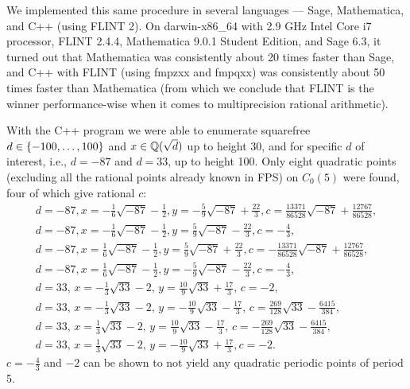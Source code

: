 We implemented this same procedure in several languages --- Sage,
Mathematica, and C++ (using FLINT 2). On darwin-x86\_64 with 2.9 GHz
Intel Core i7 processor, FLINT 2.4.4, Mathematica 9.0.1 Student
Edition, and Sage 6.3, it turned out that Mathematica was consistently
about 20 times faster than Sage, and C++ with FLINT (using fmpzxx and
fmpqxx) was consistently about 50 times faster than Mathematica (from
which we conclude that FLINT is the winner performance-wise when it
comes to multiprecision rational arithmetic).

With the C++ program we were able to enumerate squarefree $d \in
\left\{-100, \dots, 100\right\}$ and $x \in \mathbb{Q}(\sqrt{d})$ up to height 30, and
for specific $d$ of interest, i.e., $d = -87$ and $d = 33$,
up to height 100. Only eight quadratic points (excluding all the
rational points already known in FPS) on $C_0(5)$ were found, four of
which give rational $c$:
\[
\begin{gathered}
  d = -87,
  x = -\frac{1}{6} \sqrt{-87} - \frac{1}{2},
  y = -\frac{5}{9} \sqrt{-87} + \frac{22}{3},
  c = \frac{13371}{86528} \sqrt{-87} + \frac{12767}{86528},
  \\
  d = -87,
  x = -\frac{1}{6} \sqrt{-87} - \frac{1}{2},
  y = \frac{5}{9} \sqrt{-87} - \frac{22}{3},
  c = -\frac{4}{3},
  \\
  d = -87,
  x = \frac{1}{6} \sqrt{-87} - \frac{1}{2},
  y = \frac{5}{9} \sqrt{-87} + \frac{22}{3},
  c = -\frac{13371}{86528} \sqrt{-87} + \frac{12767}{86528},
  \\
  d = -87,
  x = \frac{1}{6} \sqrt{-87} - \frac{1}{2},
  y = -\frac{5}{9} \sqrt{-87} - \frac{22}{3},
  c = -\frac{4}{3},
  \\
  d = 33,\,
  x = -\frac{1}{3} \sqrt{33} - 2,\,
  y = \frac{10}{9} \sqrt{33} + \frac{17}{3},\,
  c = -2,
  \\
  d = 33,\,
  x = -\frac{1}{3} \sqrt{33} - 2,\,
  y = -\frac{10}{9} \sqrt{33} - \frac{17}{3},\,
  c = \frac{269}{128} \sqrt{33} - \frac{6415}{384},
  \\
  d = 33,\,
  x = \frac{1}{3} \sqrt{33} - 2,\,
  y = \frac{10}{9} \sqrt{33} - \frac{17}{3},\,
  c = -\frac{269}{128} \sqrt{33} - \frac{6415}{384},
  \\
  d = 33,\,
  x = \frac{1}{3} \sqrt{33} - 2,\,
  y = -\frac{10}{9} \sqrt{33} + \frac{17}{3},
  c = -2.
\end{gathered}
\]
$c = -\frac{4}{3}$ and $-2$ can be shown to not yield any quadratic
periodic points of period 5.


